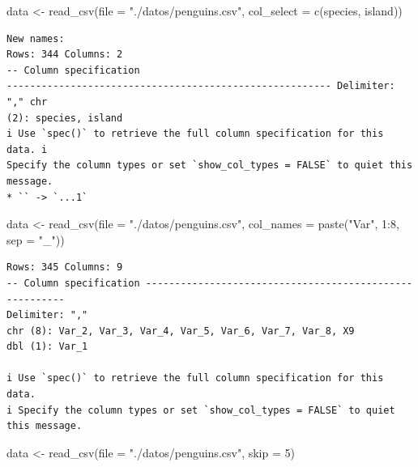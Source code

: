 \documentclass[
  letterpaper,
  DIV=11,
  numbers=noendperiod]{scrreprt}
\newenvironment{Shaded}{\begin{snugshade}}{\end{snugshade}}
\newcommand{\AttributeTok}[1]{\textcolor[rgb]{0.40,0.45,0.13}{#1}}
\newcommand{\DecValTok}[1]{\textcolor[rgb]{0.68,0.00,0.00}{#1}}
\newcommand{\FunctionTok}[1]{\textcolor[rgb]{0.28,0.35,0.67}{#1}}
\newcommand{\NormalTok}[1]{\textcolor[rgb]{0.00,0.23,0.31}{#1}}
\newcommand{\OtherTok}[1]{\textcolor[rgb]{0.00,0.23,0.31}{#1}}
\newcommand{\SpecialCharTok}[1]{\textcolor[rgb]{0.37,0.37,0.37}{#1}}
\newcommand{\StringTok}[1]{\textcolor[rgb]{0.13,0.47,0.30}{#1}}
\begin{document}
\begin{Shaded}
\begin{Highlighting}[]
\NormalTok{data }\OtherTok{\textless{}{-}} \FunctionTok{read\_csv}\NormalTok{(}\AttributeTok{file =} \StringTok{"./datos/penguins.csv"}\NormalTok{, }\AttributeTok{col\_select =} \FunctionTok{c}\NormalTok{(species, island))}
\end{Highlighting}
\end{Shaded}

\begin{verbatim}
New names:
Rows: 344 Columns: 2
-- Column specification
-------------------------------------------------------- Delimiter: "," chr
(2): species, island
i Use `spec()` to retrieve the full column specification for this data. i
Specify the column types or set `show_col_types = FALSE` to quiet this message.
* `` -> `...1`
\end{verbatim}

\begin{Shaded}
\begin{Highlighting}[]
\NormalTok{data }\OtherTok{\textless{}{-}} \FunctionTok{read\_csv}\NormalTok{(}\AttributeTok{file =} \StringTok{"./datos/penguins.csv"}\NormalTok{,}
                 \AttributeTok{col\_names =} \FunctionTok{paste}\NormalTok{(}\StringTok{"Var"}\NormalTok{, }\DecValTok{1}\SpecialCharTok{:}\DecValTok{8}\NormalTok{, }\AttributeTok{sep =} \StringTok{"\_"}\NormalTok{))}
\end{Highlighting}
\end{Shaded}

\begin{verbatim}
Rows: 345 Columns: 9
-- Column specification --------------------------------------------------------
Delimiter: ","
chr (8): Var_2, Var_3, Var_4, Var_5, Var_6, Var_7, Var_8, X9
dbl (1): Var_1

i Use `spec()` to retrieve the full column specification for this data.
i Specify the column types or set `show_col_types = FALSE` to quiet this message.
\end{verbatim}

\begin{Shaded}
\begin{Highlighting}[]
\NormalTok{data }\OtherTok{\textless{}{-}} \FunctionTok{read\_csv}\NormalTok{(}\AttributeTok{file =} \StringTok{"./datos/penguins.csv"}\NormalTok{, }\AttributeTok{skip =} \DecValTok{5}\NormalTok{)}
\end{Highlighting}
\end{Shaded}
\end{document}
